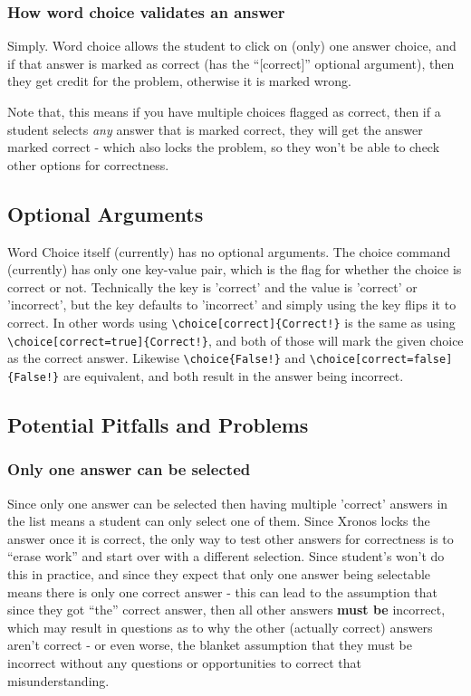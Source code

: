 \documentclass{ximera}
\begin{document}
    \subsubsection*{How word choice validates an answer}
    
        Simply. Word choice allows the student to click on (only) one answer choice, and if that answer is marked as correct (has the ``[correct]'' optional argument), then they get credit for the problem, otherwise it is marked wrong.
        
        Note that, this means if you have multiple choices flagged as correct, then if a student selects \textit{any} answer that is marked correct, they will get the answer marked correct - which also locks the problem, so they won't be able to check other options for correctness.

\subsection*{Optional Arguments}
    
    Word Choice itself (currently) has no optional arguments. The choice command (currently) has only one key-value pair, which is the flag for whether the choice is correct or not. Technically the key is 'correct' and the value is 'correct' or 'incorrect', but the key defaults to 'incorrect' and simply using the key flips it to correct. In other words using \verb|\choice[correct]{Correct!}| is the same as using \verb|\choice[correct=true]{Correct!}|, and both of those will mark the given choice as the correct answer. Likewise \verb|\choice{False!}| and \verb|\choice[correct=false]{False!}| are equivalent, and both result in the answer being incorrect.

\subsection*{Potential Pitfalls and Problems}

    
    \subsubsection*{Only one answer can be selected}
        Since only one answer can be selected then having multiple 'correct' answers in the list means a student can only select one of them. Since Xronos locks the answer once it is correct, the only way to test other answers for correctness is to ``erase work'' and start over with a different selection. Since student's won't do this in practice, and since they expect that only one answer being selectable means there is only one correct answer - this can lead to the assumption that since they got ``the'' correct answer, then all other answers \textbf{must be} incorrect, which may result in questions as to why the other (actually correct) answers aren't correct - or even worse, the blanket assumption that they must be incorrect without any questions or opportunities to correct that misunderstanding.
        
\end{document}
